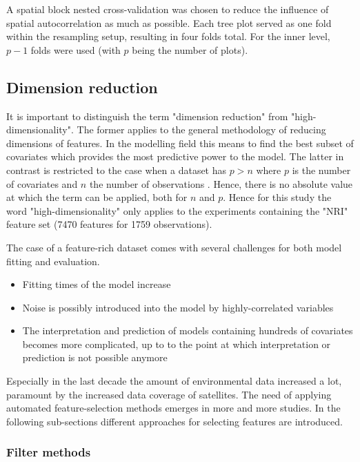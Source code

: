 \documentclass[review]{elsarticle}
\begin{document}
A spatial block nested cross-validation was chosen to reduce the influence of spatial autocorrelation as much as possible.
Each tree plot served as one fold within the resampling setup, resulting in four folds total.
For the inner level, $p - 1$ folds were used (with $p$ being the number of plots).

\subsection{Dimension reduction}

It is important to distinguish the term "dimension reduction" from "high-dimensionality".
The former applies to the general methodology of reducing dimensions of features.
In the modelling field this means to find the best subset of covariates which provides the most predictive power to the model.
The latter in contrast is restricted to the case when a dataset has $p > n$ where $p$ is the number of covariates and $n$ the number of observations \citep{Hastie2001}.
Hence, there is no absolute value at which the term can be applied, both for $n$ and $p$.
Hence for this study the word "high-dimensionality" only applies to the experiments containing the "NRI" feature set (7470 features for 1759 observations).

The case of a feature-rich dataset comes with several challenges for both model fitting and evaluation.

\begin{itemize}
  \item Fitting times of the model increase
  \item Noise is possibly introduced into the model by highly-correlated variables \citep{johnstoneiainm2009}
  \item The interpretation and prediction of models containing hundreds of covariates becomes more complicated, up to to the point at which interpretation or prediction is not possible anymore \citep{johnstoneiainm2009}
\end{itemize}

Especially in the last decade the amount of environmental data increased a lot, paramount by the increased data coverage of satellites.
The need of applying automated feature-selection methods emerges in more and more studies.
In the following sub-sections different approaches for selecting features are introduced.

\subsubsection{Filter methods}
\end{document}
